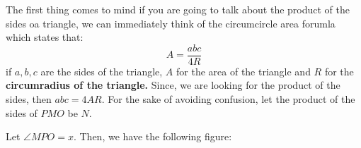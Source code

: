 \documentclass[11pt,paper=letter]{scrartcl}
\begin{document}
The first thing comes to mind if you are going to talk about the product of the sides oa triangle, we can immediately think of the circumcircle area forumla which states that: $$A = \dfrac{abc}{4R}$$ if $a,b,c$ are the sides of the triangle, $A$ for the area of the triangle and $R$ for the \textbf{circumradius of the triangle.} Since, we are looking for the product of the sides, then $abc = 4AR$. For the sake of avoiding confusion, let the product of the sides of $PMO$ be $N$.



Let $\angle MPO = x$. Then, we have the following figure:

\begin{center}




\begin{tikzpicture}[x=0.75pt,y=0.75pt,yscale=-1,xscale=1]


\end{tikzpicture}
\end{center}
\end{document}

